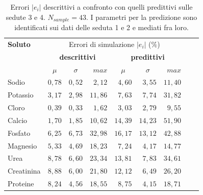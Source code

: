 \begin{table}[!h]
	\centering
	\caption{Errori $|e_i|$ descrittivi a confronto con quelli predittivi sulle sedute 3 e 4. $N_{sample}=43$. I parametri per la predizione sono identificati sui dati delle seduta 1 e 2 e mediati fra loro.}\label{tab:pred2}
	\begin{tabular}{lrrrrrrrr}
	\toprule 
		\textbf{Soluto}   &    \multicolumn{6}{c}{Errori di simulazione $|e_i|$ ($\%$)}    \\
				              &        \multicolumn{3}{c}{\textbf{descrittivi}}             &       \multicolumn{3}{c}{\textbf{predittivi}}             \\
		                  & \multicolumn{1}{c}{$\mu$}      & \multicolumn{1}{c}{$\sigma$}   & $max$   & \multicolumn{1}{c}{$\mu$}     & \multicolumn{1}{c}{$\sigma$}   & $max$  \\
    \cmidrule(lr){2-4}\cmidrule(lr){5-7}
    
	Sodio      & $0,78$ & $0,52$ & $2,12$  & $4,60$  & $3,55$  & $11,40$ \\ 
	Potassio   & $3,17$ & $2,98$ & $11,86$ & $7,63$  & $7,74$  & $31,82$ \\
	Cloro      & $0,39$ & $0,33$ & $1,62$  & $3,03$  & $2,79$  & $9,55$  \\
	Calcio     & $1,70$ & $1,85$ & $10,62$ & $14,39$ & $14,23$ & $51,90$ \\
	Fosfato    & $6,25$ & $6,73$ & $32,98$ & $16,17$ & $13,12$ & $42,88$ \\
	Magnesio   & $5,33$ & $4,69$ & $18,23$ & $7,24$  & $4,17$  & $14,77$ \\
	Urea       & $8,78$ & $6,60$ & $23,34$ & $13,81$ & $7,83$  & $34,61$ \\
	Creatinina & $8,88$ & $6,00$ & $21,80$ & $12,12$ & $6,49$  & $26,20$ \\
	Proteine   & $8,24$ & $4,56$ & $18,55$ & $8,75$  & $4,15$  & $18,71$ \\
\bottomrule
\end{tabular}
\end{table}
